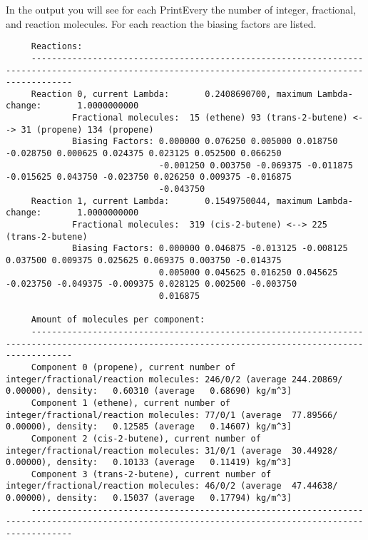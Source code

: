 In the output you will see for each PrintEvery the number of integer, fractional, and reaction molecules.
For each reaction the biasing factors are listed.
\begin{tiny}
\begin{verbatim}
     Reactions:
     ----------------------------------------------------------------------------------------------------------------------------------------------------
     Reaction 0, current Lambda:       0.2408690700, maximum Lambda-change:       1.0000000000
             Fractional molecules:  15 (ethene) 93 (trans-2-butene) <--> 31 (propene) 134 (propene)
             Biasing Factors: 0.000000 0.076250 0.005000 0.018750 -0.028750 0.000625 0.024375 0.023125 0.052500 0.066250
                              -0.001250 0.003750 -0.069375 -0.011875 -0.015625 0.043750 -0.023750 0.026250 0.009375 -0.016875
                              -0.043750
     Reaction 1, current Lambda:       0.1549750044, maximum Lambda-change:       1.0000000000
             Fractional molecules:  319 (cis-2-butene) <--> 225 (trans-2-butene)
             Biasing Factors: 0.000000 0.046875 -0.013125 -0.008125 0.037500 0.009375 0.025625 0.069375 0.003750 -0.014375
                              0.005000 0.045625 0.016250 0.045625 -0.023750 -0.049375 -0.009375 0.028125 0.002500 -0.003750
                              0.016875

     Amount of molecules per component:
     ----------------------------------------------------------------------------------------------------------------------------------------------------
     Component 0 (propene), current number of integer/fractional/reaction molecules: 246/0/2 (average 244.20869/  0.00000), density:   0.60310 (average   0.68690) kg/m^3]
     Component 1 (ethene), current number of integer/fractional/reaction molecules: 77/0/1 (average  77.89566/  0.00000), density:   0.12585 (average   0.14607) kg/m^3]
     Component 2 (cis-2-butene), current number of integer/fractional/reaction molecules: 31/0/1 (average  30.44928/  0.00000), density:   0.10133 (average   0.11419) kg/m^3]
     Component 3 (trans-2-butene), current number of integer/fractional/reaction molecules: 46/0/2 (average  47.44638/  0.00000), density:   0.15037 (average   0.17794) kg/m^3]
     ----------------------------------------------------------------------------------------------------------------------------------------------------
\end{verbatim}
\end{tiny}

